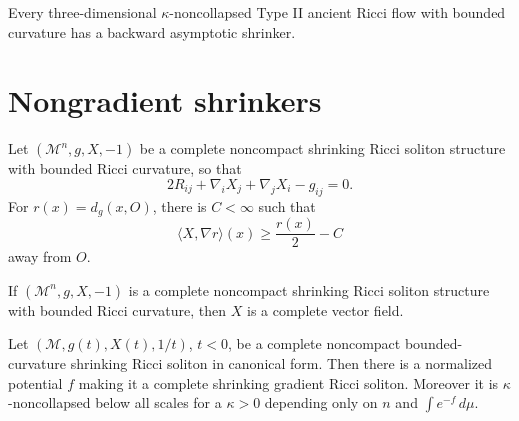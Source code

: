 \begin{theorem}
\label{thm:chow-iv-three-dimensional-type-ii-asymptotic-shrinker}

Every three-dimensional \(\kappa\)-noncollapsed Type II ancient Ricci flow
with bounded curvature has a backward asymptotic shrinker.
\end{theorem}

\section{Nongradient shrinkers}

\begin{lemma}
\label{lem:chow-iv-shrinker-vector-field-radial-bound}

Let \((\mathcal M^n,g,X,-1)\) be a complete noncompact shrinking Ricci
soliton structure with bounded Ricci curvature, so that
\[
 2R_{ij}+\nabla_iX_j+\nabla_jX_i-g_{ij}=0.
\]
For \(r(x)=d_g(x,O)\), there is \(C<\infty\) such that
\[
 \langle X,\nabla r\rangle(x)\geq\frac{r(x)}2-C
\]
away from \(O\).
\end{lemma}

\begin{lemma}
\label{lem:chow-iv-shrinker-vector-field-complete}

If \((\mathcal M^n,g,X,-1)\) is a complete noncompact shrinking Ricci
soliton structure with bounded Ricci curvature, then \(X\) is a complete
vector field.
\end{lemma}

\begin{theorem}
\label{thm:chow-iv-bounded-curvature-shrinker-gradient-noncollapsed}


Let \((\mathcal M,g(t),X(t),1/t)\), \(t<0\), be a complete noncompact
bounded-curvature shrinking Ricci soliton in canonical form.  Then there is a
normalized potential \(f\) making it a complete shrinking gradient Ricci
soliton.  Moreover it is \(\kappa\)-noncollapsed below all scales for a
\(\kappa>0\) depending only on \(n\) and \(\int e^{-f}\,d\mu\).
\end{theorem}

